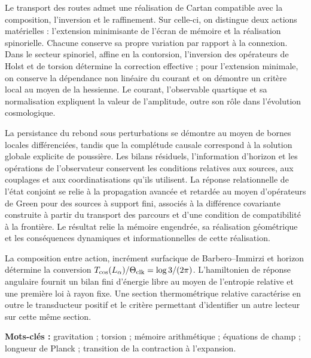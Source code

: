 Le transport des routes admet une réalisation de Cartan compatible avec la composition, l'inversion et le raffinement. Sur celle-ci, on distingue deux actions matérielles : l'extension minimisante de l'écran de mémoire et la réalisation spinorielle. Chacune conserve sa propre variation par rapport à la connexion. Dans le secteur spinoriel, affine en la contorsion, l'inversion des opérateurs de Holst et de torsion détermine la correction effective ; pour l'extension minimale, on conserve la dépendance non linéaire du courant et on démontre un critère local au moyen de la hessienne. Le courant, l'observable quartique et sa normalisation expliquent la valeur de l'amplitude, outre son rôle dans l'évolution cosmologique.

La persistance du rebond sous perturbations se démontre au moyen de bornes locales différenciées, tandis que la complétude causale correspond à la solution globale explicite de poussière. Les bilans résiduels, l'information d'horizon et les opérations de l'observateur conservent les conditions relatives aux sources, aux couplages et aux coordinatisations qu'ils utilisent. La réponse relationnelle de l'état conjoint se relie à la propagation avancée et retardée au moyen d'opérateurs de Green pour des sources à support fini, associés à la différence covariante construite à partir du transport des parcours et d'une condition de compatibilité à la frontière. Le résultat relie la mémoire engendrée, sa réalisation géométrique et les conséquences dynamiques et informationnelles de cette réalisation.

La composition entre action, incrément surfacique de Barbero--Immirzi et
horizon détermine la conversion
\(T_{\rm cos}(L_\alpha)/\Theta_{\rm clk}=\log3/(2\pi)\).
L'hamiltonien de réponse angulaire fournit un bilan fini
d'énergie libre au moyen de l'entropie relative et une première loi à rayon
fixe. Une section thermométrique relative caractérise en outre le
transducteur positif et le critère permettant d'identifier un autre lecteur sur
cette même section.

\noindent\textbf{Mots-clés :} gravitation ; torsion ; mémoire arithmétique ; équations de champ ; longueur de Planck ; transition de la contraction à l'expansion.
\par\endgroup
